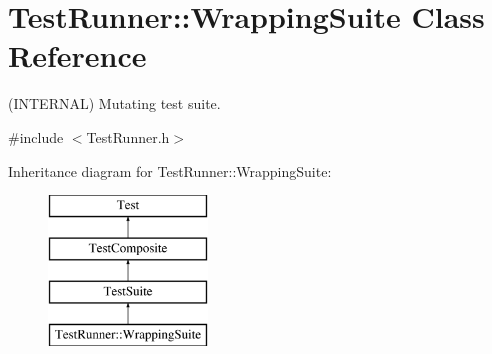 \hypertarget{class_test_runner_1_1_wrapping_suite}{}\section{Test\+Runner\+:\+:Wrapping\+Suite Class Reference}
\label{class_test_runner_1_1_wrapping_suite}


(I\+N\+T\+E\+R\+N\+AL) Mutating test suite.  




{\ttfamily \#include $<$Test\+Runner.\+h$>$}

Inheritance diagram for Test\+Runner\+:\+:Wrapping\+Suite\+:\begin{figure}[H]
\begin{center}
\leavevmode
\includegraphics[height=4.000000cm]{class_test_runner_1_1_wrapping_suite}
\end{center}
\end{figure}
